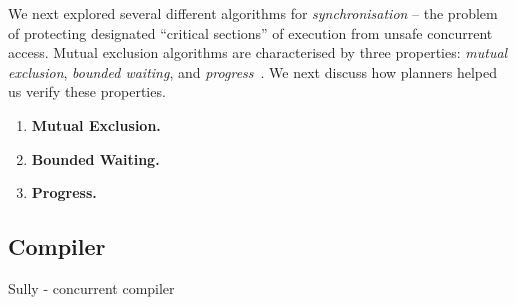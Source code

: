 We next explored several different algorithms for {\em synchronisation} -- the problem of protecting designated ``critical sections'' of execution from unsafe concurrent access. Mutual exclusion algorithms are characterised by three properties: {\em mutual exclusion}, {\em bounded waiting}, and {\em progress}~\cite{de0u}. We next discuss how planners helped us verify these properties.

\begin{enumerate}
\item {\bf Mutual Exclusion.}
\item {\bf Bounded Waiting.}
\item {\bf Progress.}
\end{enumerate}

\subsection{Compiler}
Sully - concurrent compiler
